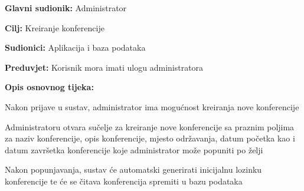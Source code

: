 				\noindent {}
				\begin{packed_item}
					
					\item \textbf{Glavni sudionik: } Administrator
					\item  \textbf{Cilj:} Kreiranje konferencije
					\item  \textbf{Sudionici:} Aplikacija i baza podataka
					\item  \textbf{Preduvjet:} Korisnik mora imati ulogu administratora
					\item  \textbf{Opis osnovnog tijeka:}
					
					\item[] \begin{packed_enum}
						
						\item Nakon prijave u sustav, administrator ima mogućnost kreiranja nove konferencije
						\item Administratoru otvara sučelje za kreiranje nove konferencije sa praznim poljima za naziv konferencije, opis konferencije, mjesto održavanja, datum početka kao i datum završetka konferencije koje administrator može popuniti po želji
						\item Nakon popunjavanja, sustav će automatski generirati inicijalnu lozinku konferencije te će se čitava konferencija spremiti u bazu podataka
					\end{packed_enum}
	
					
					
				\end{packed_item}
				
			
				
